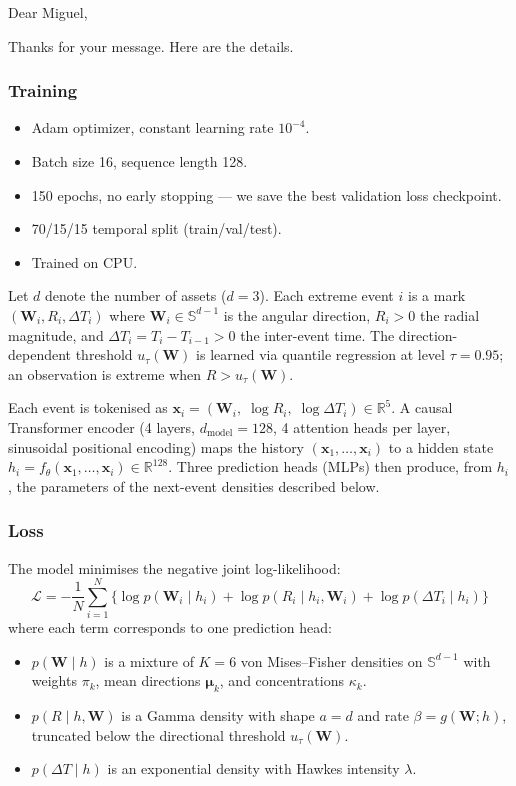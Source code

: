 \documentclass[11pt,a4paper]{article}
\begin{document}
Dear Miguel,

Thanks for your message. Here are the details.

\subsubsection*{Training}

\begin{itemize}[nosep]
  \item Adam optimizer, constant learning rate $10^{-4}$.
  \item Batch size 16, sequence length 128.
  \item 150 epochs, no early stopping --- we save the best validation loss checkpoint.
  \item 70/15/15 temporal split (train/val/test).
  \item Trained on CPU.
\end{itemize}

Let $d$ denote the number of assets ($d = 3$).
Each extreme event $i$ is a mark
$(\boldsymbol{W}_i, R_i, \Delta T_i)$
where $\boldsymbol{W}_i \in \mathbb{S}^{d-1}$ is the angular direction,
$R_i > 0$ the radial magnitude,
and $\Delta T_i = T_i - T_{i-1} > 0$ the inter-event time.
The direction-dependent threshold $u_\tau(\boldsymbol{W})$ is
learned via quantile regression at level $\tau = 0.95$;
an observation is extreme when $R > u_\tau(\boldsymbol{W})$.

Each event is tokenised as
$\boldsymbol{x}_i = (\boldsymbol{W}_i,\; \log R_i,\; \log \Delta T_i)
  \in \mathbb{R}^{5}$.
A causal Transformer encoder (4 layers,
$d_{\text{model}} = 128$, 4 attention heads per layer,
sinusoidal positional encoding) maps the history
$(\boldsymbol{x}_1, \ldots, \boldsymbol{x}_i)$ to a hidden state
$h_i = f_\theta(\boldsymbol{x}_1, \ldots, \boldsymbol{x}_i)
  \in \mathbb{R}^{128}$.
Three prediction heads (MLPs) then produce, from $h_i$,
the parameters of the next-event densities described below.

\subsubsection*{Loss}

The model minimises the negative joint log-likelihood:
%
\[
  \mathcal{L}
  = -\frac{1}{N}\sum_{i=1}^{N}
    \bigl\{
      \log p(\boldsymbol{W}_i \mid h_i)
    + \log p(R_i \mid h_i, \boldsymbol{W}_i)
    + \log p(\Delta T_i \mid h_i)
    \bigr\}
\]
%
where each term corresponds to one prediction head:
%
\begin{itemize}[nosep]
  \item $p(\boldsymbol{W} \mid h)$ is a mixture of $K{=}6$ von Mises--Fisher
        densities on $\mathbb{S}^{d-1}$ with weights $\pi_k$,
        mean directions $\boldsymbol{\mu}_k$,
        and concentrations $\kappa_k$.
  \item $p(R \mid h, \boldsymbol{W})$ is a Gamma density with
        shape $a=d$ and rate $\beta = g(\boldsymbol{W}; h)$, truncated below the
        directional threshold $u_\tau(\boldsymbol{W})$.
  \item $p(\Delta T \mid h)$ is an exponential density with Hawkes intensity
        $\lambda$.
\end{itemize}
\end{document}
